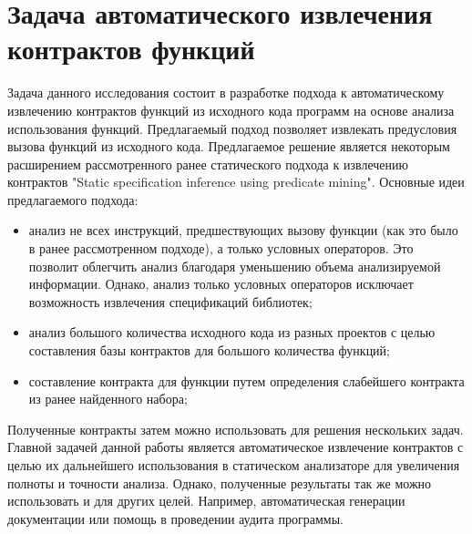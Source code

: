 \section{Задача автоматического извлечения контрактов функций}
Задача данного исследования состоит в разработке подхода к автоматическому извлечению контрактов функций из исходного кода программ на основе анализа использования функций. Предлагаемый подход позволяет извлекать предусловия вызова функций из исходного кода. Предлагаемое решение является некоторым расширением рассмотренного ранее статического подхода к извлечению контрактов "Static specification inference using predicate mining"\cite{staticPredicateMining}. Основные идеи предлагаемого подхода:
\begin{itemize}
\item анализ не всех инструкций, предшествующих вызову функции (как это было в ранее рассмотренном подходе), а только условных операторов. Это позволит облегчить анализ благодаря уменьшению объема анализируемой информации. Однако, анализ только условных операторов исключает возможность извлечения спецификаций библиотек;
\item анализ большого количества исходного кода из разных проектов с целью составления базы контрактов для большого количества функций;
\item составление контракта для функции путем определения слабейшего контракта из ранее найденного набора;
\end{itemize}

Полученные контракты затем можно использовать для решения нескольких задач. Главной задачей данной работы является автоматическое извлечение контрактов с целью их дальнейшего использования в статическом анализаторе для увеличения полноты и точности анализа. Однако, полученные результаты так же можно использовать и для других целей. Например, автоматическая генерации документации или помощь в проведении аудита программы.

